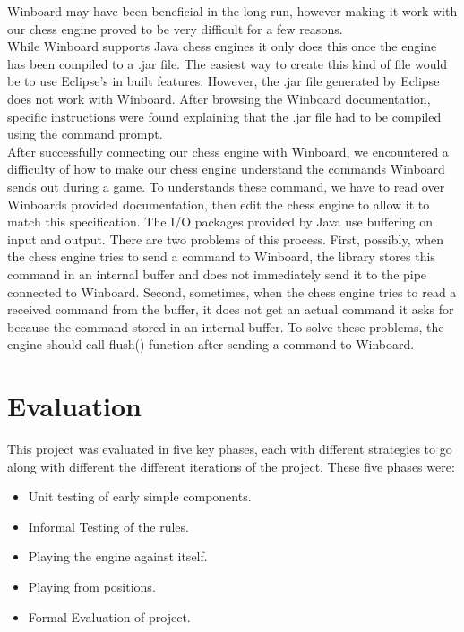 \documentclass{l3proj}
\begin{document}
Winboard may have been beneficial in the long run, however making it work with our chess engine proved to be very difficult for a few reasons. \\
	
While Winboard supports Java chess engines it only does this once the engine has been compiled to a .jar file. The easiest way to create this kind of file would be to use Eclipse's in built features. However, the .jar file generated by Eclipse does not work with Winboard. After browsing the Winboard documentation,  specific instructions were found explaining that the .jar file had to be compiled using the command prompt. \\
	
After successfully connecting our chess engine with Winboard, we encountered a difficulty of how to make our chess engine understand the commands Winboard sends out during a game. To understands these command, we have to read over Winboards provided documentation, then edit the chess engine to allow it to match this specification. The I/O packages provided by Java use buffering on input and output. There are two problems of this process. First, possibly, when the chess engine tries to send a command to Winboard, the library stores this command in an internal buffer and does not immediately send it to the pipe connected to Winboard. Second, sometimes, when the chess engine tries to read a received command from the buffer, it does not get an actual command it asks for because the command stored in an internal buffer. To solve these problems, the engine should  call  flush() function after sending a command to Winboard.

\chapter{Evaluation}

This project was evaluated in five key phases, each with different strategies to go along with different the different iterations of the project. These five phases were:

\begin{itemize}
\item Unit testing of early simple components.
\item Informal Testing of the rules.
\item Playing the engine against itself.
\item Playing from positions.
\item Formal Evaluation of project.
\end{itemize}
\end{document}
